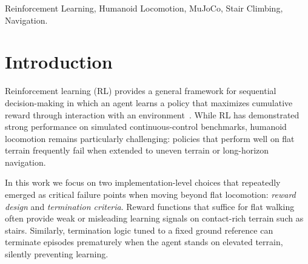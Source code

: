 \documentclass[conference,a4paper]{IEEEtran}
\begin{document}
\begin{IEEEkeywords}
Reinforcement Learning, Humanoid Locomotion, MuJoCo, Stair Climbing, Navigation.
\end{IEEEkeywords}

\section{Introduction}

Reinforcement learning (RL) provides a general framework for sequential decision-making in which an agent learns a policy that maximizes cumulative reward through interaction with an environment~\cite{sutton2018reinforcement}. While RL has demonstrated strong performance on simulated continuous-control benchmarks, humanoid locomotion remains particularly challenging: policies that perform well on flat terrain frequently fail when extended to uneven terrain or long-horizon navigation.

In this work we focus on two implementation-level choices that repeatedly emerged as critical failure points when moving beyond flat locomotion: \emph{reward design} and \emph{termination criteria}. Reward functions that suffice for flat walking often provide weak or misleading learning signals on contact-rich terrain such as stairs. Similarly, termination logic tuned to a fixed ground reference can terminate episodes prematurely when the agent stands on elevated terrain, silently preventing learning.
\end{document}
